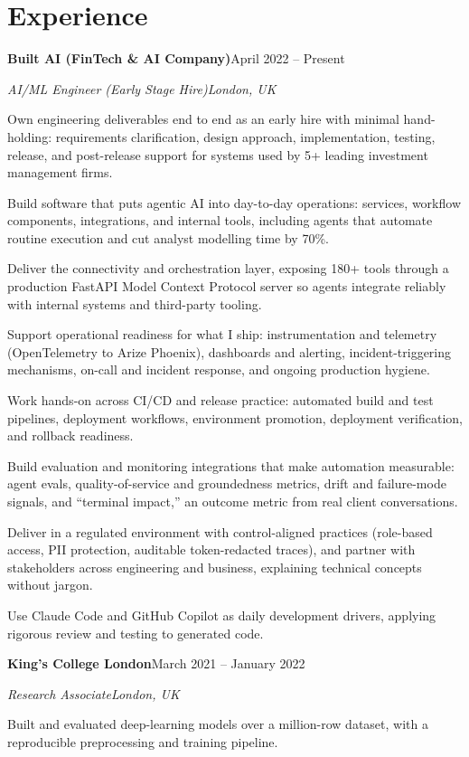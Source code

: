 \documentclass[10pt,a4paper]{article}
\newcommand{\entry}[4]{%
  {\color{company}\bfseries #1}\hfill {\color{muted}#2}\par
  \vspace{1pt}
  {\itshape #3}\hfill {\color{muted}\itshape #4}\par
  \vspace{3pt}%
}
\begin{document}
\section{Experience}
\entry{Built AI (FinTech \& AI Company)}{April 2022 -- Present}{AI/ML Engineer (Early Stage Hire)}{London, UK}
\begin{tight}
  \item Own engineering deliverables end to end as an early hire with minimal hand-holding: requirements clarification, design approach, implementation, testing, release, and post-release support for systems used by 5+ leading investment management firms.
  \item Build software that puts agentic AI into day-to-day operations: services, workflow components, integrations, and internal tools, including agents that automate routine execution and cut analyst modelling time by 70\%.
  \item Deliver the connectivity and orchestration layer, exposing 180+ tools through a production FastAPI Model Context Protocol server so agents integrate reliably with internal systems and third-party tooling.
  \item Support operational readiness for what I ship: instrumentation and telemetry (OpenTelemetry to Arize Phoenix), dashboards and alerting, incident-triggering mechanisms, on-call and incident response, and ongoing production hygiene.
  \item Work hands-on across CI/CD and release practice: automated build and test pipelines, deployment workflows, environment promotion, deployment verification, and rollback readiness.
  \item Build evaluation and monitoring integrations that make automation measurable: agent evals, quality-of-service and groundedness metrics, drift and failure-mode signals, and ``terminal impact,'' an outcome metric from real client conversations.
  \item Deliver in a regulated environment with control-aligned practices (role-based access, PII protection, auditable token-redacted traces), and partner with stakeholders across engineering and business, explaining technical concepts without jargon.
  \item Use Claude Code and GitHub Copilot as daily development drivers, applying rigorous review and testing to generated code.
\end{tight}

\entry{King's College London}{March 2021 -- January 2022}{Research Associate}{London, UK}
\begin{tight}
  \item Built and evaluated deep-learning models over a million-row dataset, with a reproducible preprocessing and training pipeline.
\end{tight}
\end{document}
